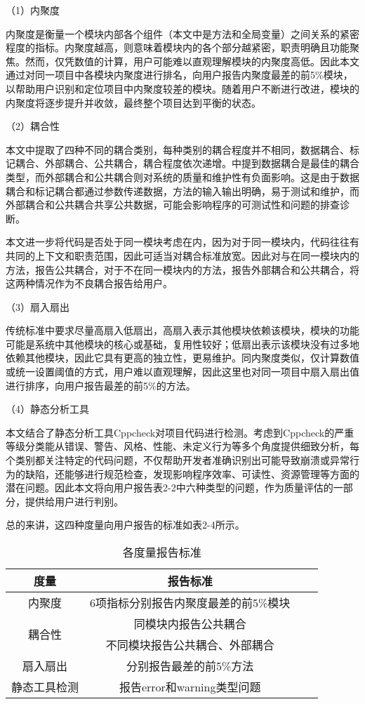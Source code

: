 （1）内聚度

内聚度是衡量一个模块内部各个组件（本文中是方法和全局变量）之间关系的紧密程度的指标。内聚度越高，则意味着模块内的各个部分越紧密，职责明确且功能聚焦。然而，仅凭数值的计算，用户可能难以直观理解模块的内聚度高低。因此本文通过对同一项目中各模块内聚度进行排名，向用户报告内聚度最差的前5\%模块，以帮助用户识别和定位项目中内聚度较差的模块。随着用户不断进行改进，模块的内聚度将逐步提升并收敛，最终整个项目达到平衡的状态。

（2）耦合性

本文中提取了四种不同的耦合类别，每种类别的耦合程度并不相同，数据耦合、标记耦合、外部耦合、公共耦合，耦合程度依次递增。中提到数据耦合是最佳的耦合类型，而外部耦合和公共耦合则对系统的质量和维护性有负面影响。这是由于数据耦合和标记耦合都通过参数传递数据，方法的输入输出明确，易于测试和维护，而外部耦合和公共耦合共享公共数据，可能会影响程序的可测试性和问题的排查诊断。

本文进一步将代码是否处于同一模块考虑在内，因为对于同一模块内，代码往往有共同的上下文和职责范围，因此可适当对耦合标准放宽。因此对与在同一模块内的方法，报告公共耦合，对于不在同一模块内的方法，报告外部耦合和公共耦合，将这两种情况作为不良耦合报告给用户。

（3）扇入扇出

传统标准中要求尽量高扇入低扇出，高扇入表示其他模块依赖该模块，模块的功能可能是系统中其他模块的核心或基础，复用性较好；低扇出表示该模块没有过多地依赖其他模块，因此它具有更高的独立性，更易维护。同内聚度类似，仅计算数值或统一设置阈值的方式，用户难以直观理解，因此这里也对同一项目中扇入扇出值进行排序，向用户报告最差的前5\%的方法。

（4）静态分析工具

本文结合了静态分析工具Cppcheck对项目代码进行检测。考虑到Cppcheck的严重等级分类能从错误、警告、风格、性能、未定义行为等多个角度提供细致分析，每个类别都关注特定的代码问题，不仅帮助开发者准确识别出可能导致崩溃或异常行为的缺陷，还能够进行规范检查，发现影响程序效率、可读性、资源管理等方面的潜在问题。因此本文将向用户报告表2-2中六种类型的问题，作为质量评估的一部分，提供给用户进行判别。

总的来讲，这四种度量向用户报告的标准如表2-4所示。

\begin{table}[htbp]
\caption{各度量报告标准}
\vspace{0.5em}\centering\wuhao
\begin{tabular}{cccc}
\toprule
度量 & 报告标准 \\
\midrule
内聚度 &  6项指标分别报告内聚度最差的前5\%模块 \\
\multirow{2}{*}{耦合性} &  同模块内报告公共耦合\\
                        & 不同模块报告公共耦合、外部耦合 \\
扇入扇出 & 分别报告最差的前5\%方法 \\
静态工具检测 &  报告error和warning类型问题\\ 
\bottomrule
\end{tabular}
\end{table}

